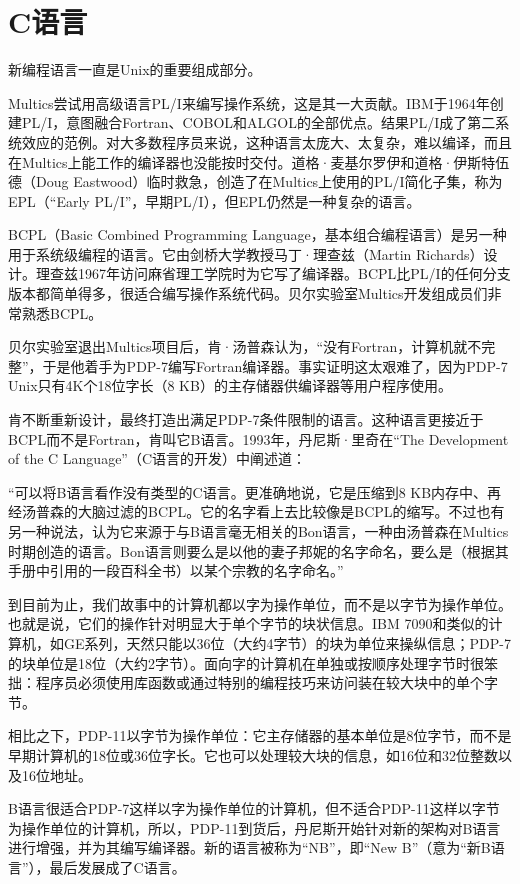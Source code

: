 \documentclass[a4paper,12pt,UTF8,twoside]{ctexbook}
\begin{document}
\section{C语言}

新编程语言一直是Unix的重要组成部分。

Multics尝试用高级语言PL/I来编写操作系统，这是其一大贡献。IBM于1964年创建PL/I，意图融合Fortran、COBOL和ALGOL的全部优点。结果PL/I成了第二系统效应的范例。对大多数程序员来说，这种语言太庞大、太复杂，难以编译，而且在Multics上能工作的编译器也没能按时交付。道格·麦基尔罗伊和道格·伊斯特伍德（Doug Eastwood）临时救急，创造了在Multics上使用的PL/I简化子集，称为EPL（“Early PL/I”，早期PL/I），但EPL仍然是一种复杂的语言。

BCPL（Basic Combined Programming Language，基本组合编程语言）是另一种用于系统级编程的语言。它由剑桥大学教授马丁·理查兹（Martin Richards）设计。理查兹1967年访问麻省理工学院时为它写了编译器。BCPL比PL/I的任何分支版本都简单得多，很适合编写操作系统代码。贝尔实验室Multics开发组成员们非常熟悉BCPL。

贝尔实验室退出Multics项目后，肯·汤普森认为，“没有Fortran，计算机就不完整”，于是他着手为PDP-7编写Fortran编译器。事实证明这太艰难了，因为PDP-7 Unix只有4K个18位字长（8 KB）的主存储器供编译器等用户程序使用。

肯不断重新设计，最终打造出满足PDP-7条件限制的语言。这种语言更接近于BCPL而不是Fortran，肯叫它B语言。1993年，丹尼斯·里奇在“The Development of the C Language”（C语言的开发）中阐述道：

“可以将B语言看作没有类型的C语言。更准确地说，它是压缩到8 KB内存中、再经汤普森的大脑过滤的BCPL。它的名字看上去比较像是BCPL的缩写。不过也有另一种说法，认为它来源于与B语言毫无相关的Bon语言，一种由汤普森在Multics时期创造的语言。Bon语言则要么是以他的妻子邦妮的名字命名，要么是（根据其手册中引用的一段百科全书）以某个宗教的名字命名。”

到目前为止，我们故事中的计算机都以字为操作单位，而不是以字节为操作单位。也就是说，它们的操作针对明显大于单个字节的块状信息。IBM 7090和类似的计算机，如GE系列，天然只能以36位（大约4字节）的块为单位来操纵信息；PDP-7的块单位是18位（大约2字节）。面向字的计算机在单独或按顺序处理字节时很笨拙：程序员必须使用库函数或通过特别的编程技巧来访问装在较大块中的单个字节。

相比之下，PDP-11以字节为操作单位：它主存储器的基本单位是8位字节，而不是早期计算机的18位或36位字长。它也可以处理较大块的信息，如16位和32位整数以及16位地址。

B语言很适合PDP-7这样以字为操作单位的计算机，但不适合PDP-11这样以字节为操作单位的计算机，所以，PDP-11到货后，丹尼斯开始针对新的架构对B语言进行增强，并为其编写编译器。新的语言被称为“NB”，即“New B”（意为“新B语言”），最后发展成了C语言。
\end{document}
